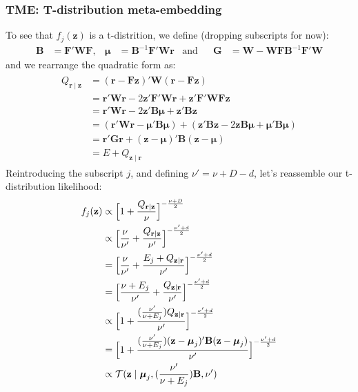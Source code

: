 \documentclass[a4paper,oneside,12pt,english]{report}
\def\zvec{\mathbf{z}}
\def\Bmat{\mathbf{B}}
\def\Wmat{\mathbf{W}}
\def\Fmat{\mathbf{F}}
\def\Gmat{\mathbf{G}}
\def\Gmat{\mathbf{G}}
\def\rvec{\mathbf{r}}
\def\muvec{\boldsymbol{\mu}}
\begin{document}
\subsubsection{TME: T-distribution meta-embedding}
To see that $f_j(\zvec)$ is a t-distrition, we define (dropping subscripts for now): 
\begin{align}
\label{eq:defBmuG}
\Bmat &= \Fmat'\Wmat\Fmat,& \muvec &= \Bmat^{-1}\Fmat'\Wmat\rvec& \text{and} && \Gmat &= \Wmat-\Wmat\Fmat\Bmat^{-1}\Fmat'\Wmat 
\end{align}
and we rearrange the quadratic form as:
\begin{align}
\label{eq:rearrangeQ}
\begin{split}
Q_{\rvec\mid\zvec} &= (\rvec-\Fmat\zvec)'\Wmat(\rvec-\Fmat\zvec)\\ 
&= \rvec'\Wmat\rvec -2\zvec'\Fmat'\Wmat\rvec + \zvec'\Fmat'\Wmat\Fmat\zvec \\
&= \rvec'\Wmat\rvec -2\zvec'\Bmat\muvec + \zvec'\Bmat\zvec \\
&= (\rvec'\Wmat\rvec -\muvec'\Bmat\muvec) + (\zvec'\Bmat\zvec -2\zvec\Bmat\muvec + \muvec'\Bmat\muvec) \\
&= \rvec'\Gmat\rvec + (\zvec-\muvec)'\Bmat(\zvec-\muvec) \\
&= E + Q_{\zvec\mid\rvec}
\end{split}
\end{align}
Reintroducing the subscript $j$, and defining $\nu'=\nu+D-d$, let's reassemble our t-distribution likelihood:
\begin{align}
\label{eq:TME}
\begin{split}
f_j(\zvec) &\propto \Bigl[1+\frac{Q_{\rvec\mid\zvec}}{\nu}\Bigr]^{-\frac{\nu+D}{2}} \\
&\propto\Bigl[\frac{\nu}{\nu'}+\frac{Q_{\rvec\mid\zvec}}{\nu'}\Bigr]^{-\frac{\nu'+d}{2}} \\
&= \Bigl[\frac{\nu}{\nu'}+\frac{E_j + Q_{\zvec\mid\rvec}}{\nu'}\Bigr]^{-\frac{\nu'+d}{2}} \\
&= \Bigl[\frac{\nu+E_j}{\nu'} + \frac{Q_{\zvec\mid\rvec}}{\nu'}\Bigr]^{-\frac{\nu'+d}{2}} \\
&\propto \Bigl[1 + \frac{(\frac{\nu'}{\nu+E_j})Q_{\zvec\mid\rvec}}{\nu'}\Bigr]^{-\frac{\nu'+d}{2}} \\
&= \Bigl[1 + \frac{(\frac{\nu'}{\nu+E_j})(\zvec-\muvec_j)'\Bmat(\zvec-\muvec_j)}{\nu'}\Bigr]^{-\frac{\nu'+d}{2}} \\
&\propto\TD(\zvec\mid \muvec_j,(\frac{\nu'}{\nu+E_j})\Bmat,\nu')
\end{split}
\end{align}
\end{document}

